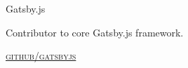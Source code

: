 {
  {\raggedright\large {
    Gatsby.js
  } \\}

  Contributor to core Gatsby.js framework.

  \textsc{\small\href{http://github.com/gatsbyjs}{github/gatsbyjs}}
} \\
